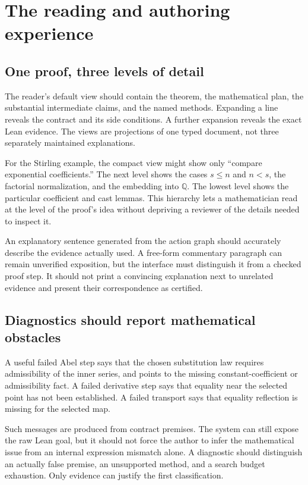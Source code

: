 \documentclass[11pt,a4paper]{article}
\newcommand{\Q}{\mathbb Q}
\theoremstyle{remark}
\begin{document}
\section{The reading and authoring experience}
\label{sec:experience}

\subsection{One proof, three levels of detail}

The reader's default view should contain the theorem, the mathematical plan, the substantial intermediate claims, and the named methods. Expanding a line reveals the contract and its side conditions. A further expansion reveals the exact Lean evidence. The views are projections of one typed document, not three separately maintained explanations.

For the Stirling example, the compact view might show only ``compare exponential coefficients.'' The next level shows the cases $s\le n$ and $n<s$, the factorial normalization, and the embedding into $\Q$. The lowest level shows the particular coefficient and cast lemmas. This hierarchy lets a mathematician read at the level of the proof's idea without depriving a reviewer of the details needed to inspect it.

An explanatory sentence generated from the action graph should accurately describe the evidence actually used. A free-form commentary paragraph can remain unverified exposition, but the interface must distinguish it from a checked proof step. It should not print a convincing explanation next to unrelated evidence and present their correspondence as certified.

\subsection{Diagnostics should report mathematical obstacles}

A useful failed Abel step says that the chosen substitution law requires admissibility of the inner series, and points to the missing constant-coefficient or admissibility fact. A failed derivative step says that equality near the selected point has not been established. A failed transport says that equality reflection is missing for the selected map.

Such messages are produced from contract premises. The system can still expose the raw Lean goal, but it should not force the author to infer the mathematical issue from an internal expression mismatch alone. A diagnostic should distinguish an actually false premise, an unsupported method, and a search budget exhaustion. Only evidence can justify the first classification.
\end{document}
